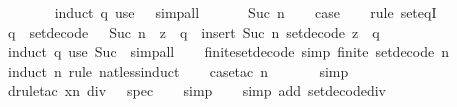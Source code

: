 \begin{isabellebody}
\ \ \ \ \ \ \isamarkupfalse%
\ {\isacharparenleft}induct\ q{\isacharparenright}\ {\isacharparenleft}use\ {}\ \ simp{\isacharunderscore}all{\isacharparenright}\isanewline
\ \ \isamarkupfalse%
\isanewline
{}\isamarkupfalse%
\isanewline
\ \ \isamarkupfalse%
\ {\isacharparenleft}Suc\ n{\isacharparenright}\isanewline
\ \ \isamarkupfalse%
\ {\isacharquery}case\isanewline
\ \ \isamarkupfalse%
\ {\isacharparenleft}rule\ set{\isacharunderscore}eqI{\isacharparenright}\isanewline
\ \ \ \ \isamarkupfalse%
\ {\isachardoublequoteopen}q\ {\isasymin}\ set{\isacharunderscore}decode\ {\isacharparenleft}{}\ {\isacharcircum}\ Suc\ n\ {\isacharplus}\ z{\isacharparenright}\ {\isasymlongleftrightarrow}\ q\ {\isasymin}\ insert\ {\isacharparenleft}Suc\ n{\isacharparenright}\ {\isacharparenleft}set{\isacharunderscore}decode\ z{\isacharparenright}{\isachardoublequoteclose}\ \ q\isanewline
\ \ \ \ \ \ \isamarkupfalse%
\ {\isacharparenleft}induct\ q{\isacharparenright}\ {\isacharparenleft}use\ Suc\ \ simp{\isacharunderscore}all{\isacharparenright}\isanewline
\ \ \isamarkupfalse%
\isanewline
{}\isamarkupfalse%
%
\endisatagproof
{\isafoldproof}%
%
\isadelimproof
\isanewline
%
\endisadelimproof
\isanewline
{}\isamarkupfalse%
\ finite{\isacharunderscore}set{\isacharunderscore}decode\ {\isacharbrackleft}simp{\isacharbrackright}{\isacharcolon}\ {\isachardoublequoteopen}finite\ {\isacharparenleft}set{\isacharunderscore}decode\ n{\isacharparenright}{\isachardoublequoteclose}\isanewline
%
\isadelimproof
\ \ %
\endisadelimproof
%
\isatagproof
{}\isamarkupfalse%
\ {\isacharparenleft}induct\ n\ rule{\isacharcolon}\ nat{\isacharunderscore}less{\isacharunderscore}induct{\isacharparenright}\isanewline
\ \ \isamarkupfalse%
\ {\isacharparenleft}case{\isacharunderscore}tac\ {\isachardoublequoteopen}n\ {\isacharequal}\ {}{\isachardoublequoteclose}{\isacharparenright}\isanewline
\ \ \ \isamarkupfalse%
\ simp\isanewline
\ \ \isamarkupfalse%
\ {\isacharparenleft}drule{\isacharunderscore}tac\ x{\isacharequal}{\isachardoublequoteopen}n\ div\ {}{\isachardoublequoteclose}\ \ spec{\isacharparenright}\isanewline
\ \ \isamarkupfalse%
\ simp\isanewline
\ \ \isamarkupfalse%
\ {\isacharparenleft}simp\ add{\isacharcolon}\ set{\isacharunderscore}decode{\isacharunderscore}div{\isacharunderscore}{}{\isacharparenright}\isanewline

\end{isabellebody}
